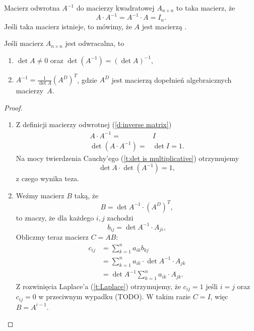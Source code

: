 \begin{definition}
    \label{d:inverse matrix}
    Macierz odwrotna $A^{-1}$ do macierzy kwadratowej $A_{n\times n}$ to taka macierz, że
    \[ A\cdot A^{-1} = A^{-1}\cdot A = I_n. \]
    Jeśli taka macierz istnieje, to mówimy, że $A$ jest macierzą .
\end{definition}

\begin{theorem}
    \label{t:invertible matrix}
    Jeśli macierz $A_{n\times n}$ jest odwracalna, to
    \begin{enumerate}
        \item $\det A \neq 0$ oraz $\det (A^{-1}) = (\det A)^{-1}$,
        \item $A^{-1} = \frac{1}{\det A} (A^D)^T$, gdzie $A^D$ jest macierzą dopełnień algebraicznych macierzy~$A$.
    \end{enumerate}
\end{theorem}
\begin{proof}
    \begin{enumerate}
        \item Z definicji macierzy odwrotnej (\ref{d:inverse matrix})
            \[ \begin{aligned} A\cdot A^{-1} =& I \\
                         \det(A\cdot A^{-1}) =& \det I = 1.
            \end{aligned} \]
            Na mocy twierdzenia Cauchy'ego (\ref{t:det is multiplicative}) otrzymujemy
            \[ \det A \cdot \det (A^{-1}) = 1, \]
            z czego wynika teza.
        \item Weźmy macierz $B$ taką, że
            \[ B = \det A^{-1} \cdot (A^D)^T, \]
            to znaczy, że dla każdego $i,j$ zachodzi
            \[ b_{ij} = \det A^{-1} \cdot A_{ji}, \]
            Obliczmy teraz macierz $C = AB$:
            \[ \begin{aligned}
                c_{ij} &= \sum_{k=1}^n a_{ik} b_{kj} \\
                       &= \sum_{k=1}^n a_{ik}\cdot\det A^{-1}\cdot A_{jk} \\
                       &= \det A^{-1}\sum_{k=1}^n a_{ik}\cdot A_{jk}.
            \end{aligned} \]
            Z rozwinięcia Laplace'a (\ref{t:Laplace}) otrzymujemy, że $c_{ij} = 1$ jeśli $i = j$ oraz $c_{ij} = 0$ w przeciwnym wypadku (TODO). W takim razie $C = I$, więc $B = A^{i-1}$.
    \end{enumerate}
\end{proof}

